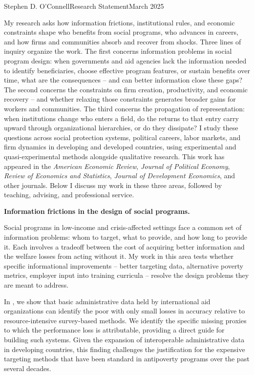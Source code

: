 \documentclass[10pt, letter]{article}
\date{\AdvanceDate[-1]\today}  %
\newcommand\threethings[3]{%
  \noindent #1\hfill #2\hfill #3\\\ignorespaces
}
\begin{document}
\vspace*{-2cm}

\threethings{Stephen D. O'Connell}{Research Statement}{March 2025}

\noindent My research asks how information frictions, institutional rules, and economic constraints shape who benefits from social programs, who advances in careers, and how firms and communities absorb and recover from shocks. Three lines of inquiry organize the work. The first concerns information problems in social program design: when governments and aid agencies lack the information needed to identify beneficiaries, choose effective program features, or sustain benefits over time, what are the consequences -- and can better information close these gaps? The second concerns the constraints on firm creation, productivity, and economic recovery -- and whether relaxing those constraints generates broader gains for workers and communities. The third concerns the propagation of representation: when institutions change who enters a field, do the returns to that entry carry upward through organizational hierarchies, or do they dissipate? I study these questions across social protection systems, political careers, labor markets, and firm dynamics in developing and developed countries, using experimental and quasi-experimental methods alongside qualitative research. This work has appeared in the \emph{American Economic Review}, \emph{Journal of Political Economy}, \emph{Review of Economics and Statistics}, \emph{Journal of Development Economics}, and other journals. Below I discuss my work in these three areas, followed by teaching, advising, and professional service.

\noindent \textbf{Information frictions in the design of social programs.}

Social programs in low-income and crisis-affected settings face a common set of information problems: whom to target, what to provide, and how long to provide it. Each involves a tradeoff between the cost of acquiring better information and the welfare losses from acting without it. My work in this area tests whether specific informational improvements -- better targeting data, alternative poverty metrics, employer input into training curricula -- resolve the design problems they are meant to address.

In , we show that basic administrative data held by international aid organizations can identify the poor with only small losses in accuracy relative to resource-intensive survey-based methods. We identify the specific missing proxies to which the performance loss is attributable, providing a direct guide for building such systems. Given the expansion of interoperable administrative data in developing countries, this finding challenges the justification for the expensive targeting methods that have been standard in antipoverty programs over the past several decades.
\end{document}
